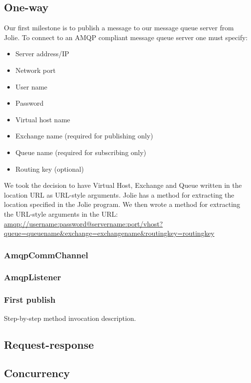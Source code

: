 \subsection{One-way}
Our first milestone is to publish a message to our message queue server from Jolie. To connect to an AMQP compliant message queue server one must specify:
\begin{itemize}
\item Server address/IP
\item Network port
\item User name
\item Password
\item Virtual host name
\item Exchange name (required for publishing only)
\item Queue name (required for subscribing only)
\item Routing key (optional)
\end{itemize}
We took the decision to have Virtual Host, Exchange and Queue written in the location URL as URL-style arguments. Jolie has a method for extracting the location specified in the Jolie program. We then wrote a method for extracting the URL-style arguments in the URL:\\
\url{amqp://username:password@servername:port/vhost?queue=queuename&exchange=exchangename&routingkey=routingkey}\\
\subsubsection{AmqpCommChannel}

\subsubsection{AmqpListener}
\subsubsection{First publish}
Step-by-step method invocation description.
\subsection{Request-response}
\subsection{Concurrency}
\newpage
